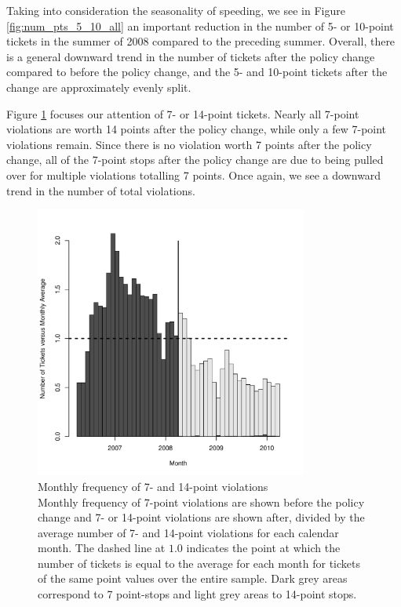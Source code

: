 Taking into consideration the seasonality of speeding, we see 
in Figure \ref{fig:num_pts_5_10_all}
an important reduction in the number of 5- or 10-point tickets 
in the summer of 2008 compared to the preceding summer. 
Overall, there is a general downward trend in the number of tickets 
after the policy change compared to before the policy change, 
and the 5- and 10-point tickets after the change are approximately evenly split. 

Figure \ref{fig:num_pts_7_14_all} focuses our attention of 7- or 14-point tickets. 
Nearly all 7-point violations are worth 14 points after the policy change, 
while only a few 7-point violations remain. 
Since there is no violation worth 7 points after the policy change, 
all of the 7-point stops after the policy change are due to being pulled over 
for multiple violations totalling 7 points. 
Once again, we see a downward trend in the number of total violations. 


\begin{figure}
\centering
\includegraphics[width=0.8\textwidth]{Figures/num_pts_7_14_all}
\caption{Monthly frequency of 7- and 14-point violations \\
Monthly frequency of 7-point violations are shown before the policy change 
and 7- or 14-point violations are shown after, 
divided by the average number of 7- and 14-point violations
for each calendar month. 
% 
The dashed line at $1.0$ indicates the point at which 
the number of tickets is equal to the average for each month 
for tickets of the same point values over the entire sample.
% 
Dark grey areas correspond to 7 point-stops and light grey areas to 14-point stops.
}\label{fig:num_pts_7_14_all}
\end{figure}


